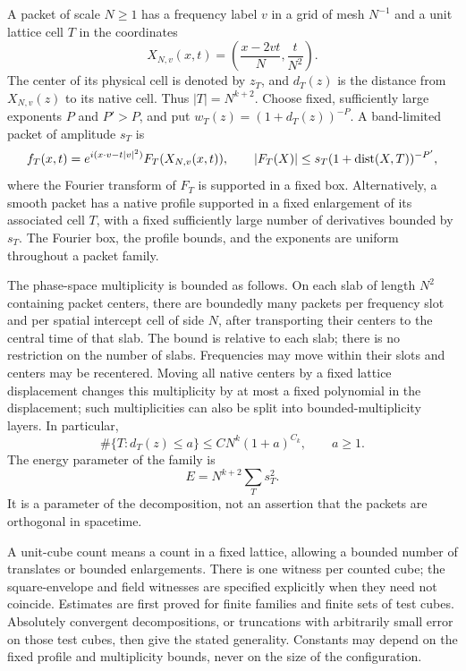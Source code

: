 \begin{convention}\label{p:conventions}
A packet of scale $N\geq1$ has a frequency label $v$ in a grid of mesh
$N^{-1}$ and a unit lattice cell $T$ in the coordinates
\begin{equation}\label{p:native}
 X_{N,v}(x,t)=\left(\frac{x-2vt}{N},\frac{t}{N^2}\right).
\end{equation}
The center of its physical cell is denoted by $z_T$, and $d_T(z)$ is the
distance from $X_{N,v}(z)$ to its native cell.  Thus $|T|=N^{k+2}$.
Choose fixed, sufficiently large exponents $P$ and $P'>P$, and put
$w_T(z)=(1+d_T(z))^{-P}$.  A band-limited packet of amplitude $s_T$ is
\[
 f_T(x,t)=e^{i(x\cdot v-t|v|^2)}F_T(X_{N,v}(x,t)),\qquad
 |F_T(X)|\leq s_T(1+\operatorname{dist}(X,T))^{-P'},
\]
where the Fourier transform of $F_T$ is supported in a fixed box.  Alternatively,
a smooth packet has a native profile supported in a fixed enlargement of
its associated cell $T$, with a fixed sufficiently large number of
derivatives bounded by $s_T$.
The Fourier box, the profile bounds, and the exponents are uniform throughout
a packet family.

The phase-space multiplicity is bounded as follows.  On each slab of length
$N^2$ containing packet centers, there are boundedly many packets per frequency
slot and per spatial intercept cell of side $N$, after transporting their
centers to the central time of that slab.  The bound is relative to each slab;
there is no restriction on the number of slabs.  Frequencies may move within
their slots and centers may be recentered.  Moving all native centers by a
fixed lattice displacement changes this multiplicity by at most a fixed
polynomial in the displacement; such multiplicities can also be split into
bounded-multiplicity layers.  In particular,
\begin{equation}\label{p:count}
 \#\{T:d_T(z)\leq a\}\leq C N^k(1+a)^{C_k},\qquad a\geq1.
\end{equation}
The energy parameter of the family is
\begin{equation}\label{p:energy}
 E=N^{k+2}\sum_Ts_T^2.
\end{equation}
It is a parameter of the decomposition, not an assertion that the packets are
orthogonal in spacetime.

A unit-cube count means a count in a fixed lattice, allowing a bounded number
of translates or bounded enlargements.  There is one witness per counted cube;
the square-envelope and field witnesses are specified explicitly when they
need not coincide.  Estimates are first proved for finite families and finite
sets of test cubes.  Absolutely convergent decompositions, or truncations with
arbitrarily small error on those test cubes, then give the stated generality.
Constants may depend on the fixed profile and multiplicity bounds, never on
the size of the configuration.
\end{convention}

